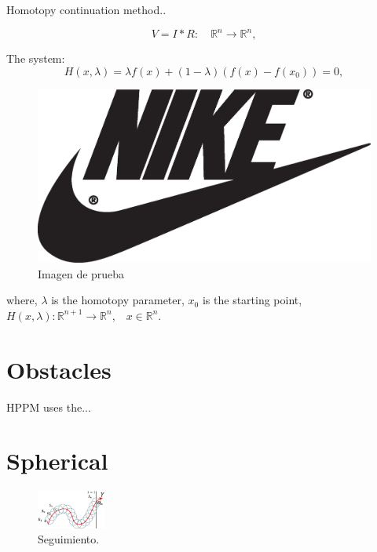 \documentclass[conference]{IEEEtran}
\begin{document}
Homotopy continuation method..

\begin{equation}
\label{ohm}
V=I*R:\quad\mathbb{R}^{n}\longrightarrow\mathbb{R}^{n},
\end{equation}

The system:  
 \begin{equation}
    \label{Homotopia_G}
     H(x,\lambda)= \lambda f(x)+ (1-\lambda)(f(x)- f(x_0))=0,
 \end{equation}
 
 \begin{figure}
 	\includegraphics[scale=1]{imagenes/img1.eps}
 	\caption{Imagen de prueba}
 	\label{fig:img1}
 \end{figure}
     
     
     
 where,   $\lambda$ is the homotopy parameter,  $x_0$  is the starting point, $H( x,\lambda) :\mathbb{R}^{n+1}\longrightarrow \mathbb{R}^{n} \text{,} \quad{x} \in\mathbb{R}^{n}$. 
\section{Obstacles}
HPPM uses the...%

\section{Spherical}
 \begin{figure}[H]
\begin{center}
\includegraphics[width=0.2\textwidth]{imagenes/hiper2.eps} 
\caption{ Seguimiento.}
\label{fig:hiper2}
\end{center}
\end{figure}    
\end{document}
